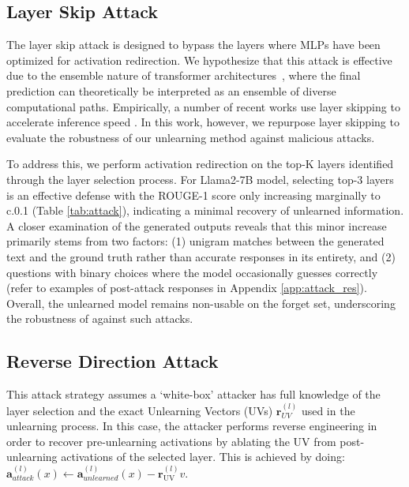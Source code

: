 \vspace{-2mm}
\subsection{Layer Skip Attack} \label{sec:skip_attack}
The layer skip attack is designed to bypass the layers where MLPs have been optimized for activation redirection. 
We hypothesize that this attack is effective due to the ensemble nature of transformer architectures~\citep{NIPS2016_37bc2f75,chen2024jetexpansionsresidualcomputation}, where the final prediction can theoretically be interpreted as an ensemble of diverse computational paths.
Empirically, a number of recent works use layer skipping to accelerate inference speed \citep{chen2020low,Fan2020Reducing, fan2024not, elhoushi-etal-2024-layerskip}. In this work, however, we repurpose layer skipping to evaluate the robustness of our unlearning method against malicious attacks.

To address this, we perform activation redirection on the top-K layers identified through the layer selection process. For Llama2-7B model, selecting top-3 layers is an effective defense with the ROUGE-1 score only increasing marginally to c.0.1 (Table \ref{tab:attack}), indicating a minimal recovery of unlearned information. A closer examination of the generated outputs reveals that this minor increase primarily stems from two factors: (1) unigram matches between the generated text and the ground truth rather than accurate responses in its entirety, and (2) questions with binary choices where the model occasionally guesses correctly (refer to examples of post-attack responses in Appendix \ref{app:attack_res}). Overall, the unlearned model remains non-usable on the forget set, underscoring the robustness of \lunar against such attacks.


\vspace{-3mm}
\subsection{Reverse Direction Attack} \label{sec:reverse_direction_attack}

This attack strategy assumes a `white-box' attacker has full knowledge of the layer selection and the exact Unlearning Vectors (UVs) $\mathbf{r}^{(l)}_{UV}$ used in the unlearning process. In this case, the attacker performs reverse engineering in order to recover pre-unlearning activations by ablating the UV from post-unlearning activations of the selected layer. This is achieved by doing: $\mathbf{a}_{attack}^{(l)}(x) \leftarrow \mathbf{a}_{unlearned}^{(l)}(x) - \mathbf{r}_{\text{UV}}^{(l)}v$. 

